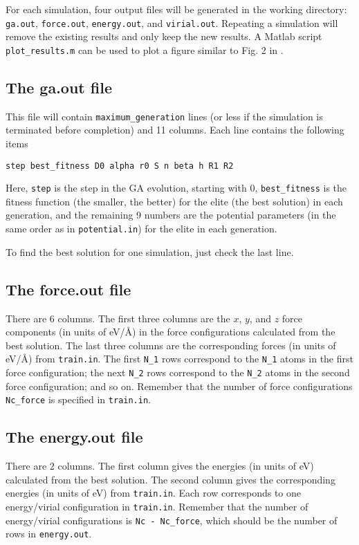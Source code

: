 \documentclass[12pt,a4paper]{report}
\begin{document}
For each simulation, four output files will be generated in the working directory: \verb"ga.out", \verb"force.out", \verb"energy.out", and \verb"virial.out". Repeating a simulation will remove the existing results and only keep the new results. A Matlab script \verb"plot_results.m" can be used to plot a figure similar to Fig. 2 in \cite{fan2019arxiv}.

\subsection{The ga.out file}

This file will contain \verb"maximum_generation" lines (or less if the simulation is terminated before completion) and 11 columns. Each line contains the following items
\begin{verbatim}
step best_fitness D0 alpha r0 S n beta h R1 R2
\end{verbatim}
Here, \verb"step" is the step in the GA evolution, starting with 0, \verb"best_fitness" is the fitness function (the smaller, the better) for the elite (the best solution) in each generation, and the remaining 9 numbers are the potential parameters (in the same order as in \verb"potential.in") for the elite in each generation.

To find the best solution for one simulation, just check the last line.

\subsection{The force.out file}

There are 6 columns. The first three columns are the $x$, $y$, and $z$ force components (in units of eV/\AA) in the force configurations calculated from the best solution. The last three columns are the corresponding forces (in units of eV/\AA) from \verb"train.in". The first \verb"N_1" rows correspond to the \verb"N_1" atoms in the first force configuration; the next \verb"N_2" rows correspond to the \verb"N_2" atoms in the second force configuration; and so on. Remember that the number of force configurations \verb"Nc_force" is specified in \verb"train.in".

\subsection{The energy.out file}

There are 2 columns. The first column gives the energies (in units of eV) calculated from the best solution. The second column gives the corresponding energies (in units of eV) from \verb"train.in". Each row corresponds to one energy/virial configuration in \verb"train.in". Remember that the number of energy/virial configurations is \verb"Nc - Nc_force", which should be the number of rows in \verb"energy.out".
\end{document}

